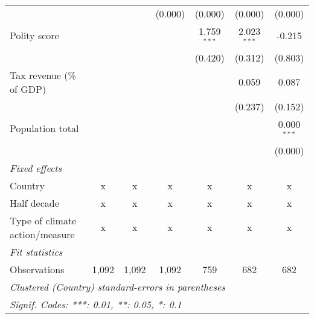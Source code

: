 \begin{tabular}{lcccccc}
                                                                                          &         &         & (0.000)       & (0.000)       & (0.000)       & (0.000)\\   
   Polity score                                                                           &         &         &               & 1.759$^{***}$ & 2.023$^{***}$ & -0.215\\   
                                                                                          &         &         &               & (0.420)       & (0.312)       & (0.803)\\   
   Tax revenue (\% of GDP)                                                                &         &         &               &               & 0.059         & 0.087\\   
                                                                                          &         &         &               &               & (0.237)       & (0.152)\\   
   Population total                                                                       &         &         &               &               &               & 0.000$^{***}$\\   
                                                                                          &         &         &               &               &               & (0.000)\\   
   \emph{Fixed effects}\\
   Country                                                                                & x       & x       & x             & x             & x             & x\\  
   Half decade                                                                            & x       & x       & x             & x             & x             & x\\  
   Type of climate action/measure                                                         & x       & x       & x             & x             & x             & x\\  
   \midrule \emph{Fit statistics}\\
   Observations                                                                           & 1,092   & 1,092   & 1,092         & 759           & 682           & 682\\  
   \midrule
   \multicolumn{7}{l}{\emph{Clustered (Country) standard-errors in parentheses}}\\
   \multicolumn{7}{l}{\emph{Signif. Codes: ***: 0.01, **: 0.05, *: 0.1}}\\
\end{tabular}
\par\endgroup


